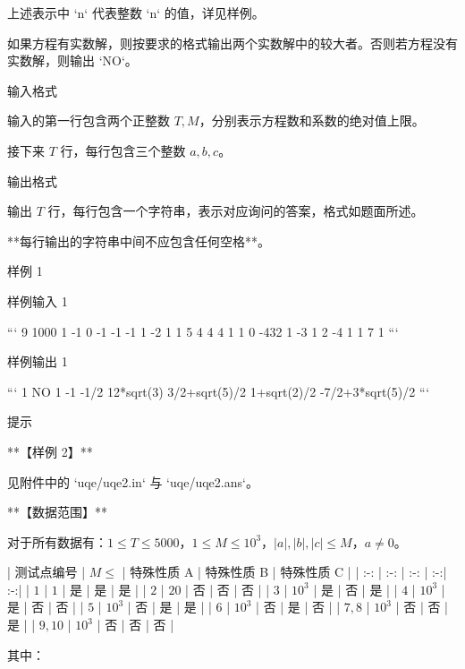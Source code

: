 \documentclass[12pt,twiside,a4paper]{ctexbook}
\numberwithin{chapter}{part}
\begin{document}
   上述表示中 `{n}` 代表整数 `{n}` 的值，详见样例。
   
   如果方程有实数解，则按要求的格式输出两个实数解中的较大者。否则若方程没有实数解，则输出 `NO`。

 输入格式

输入的第一行包含两个正整数 $T, M$，分别表示方程数和系数的绝对值上限。

接下来 $T$ 行，每行包含三个整数 $a, b, c$。

 输出格式

输出 $T$ 行，每行包含一个字符串，表示对应询问的答案，格式如题面所述。

**每行输出的字符串中间不应包含任何空格**。

 样例 1

 样例输入 1

```
9 1000
1 -1 0
-1 -1 -1
1 -2 1
1 5 4
4 4 1
1 0 -432
1 -3 1
2 -4 1
1 7 1
```

 样例输出 1

```
1
NO
1
-1
-1/2
12*sqrt(3)
3/2+sqrt(5)/2
1+sqrt(2)/2
-7/2+3*sqrt(5)/2
```

 提示

**【样例 2】**

见附件中的 `uqe/uqe2.in` 与 `uqe/uqe2.ans`。

**【数据范围】**

对于所有数据有：$1 \leq T \leq 5000$，$1 \leq M \leq 10 ^ 3$，$|a|,|b|,|c| \leq M$，$a \neq 0$。

| 测试点编号 | $M \leq$ | 特殊性质 A | 特殊性质 B | 特殊性质 C |
| :-: | :-: | :-: | :-:| :-:|
| $1$ | $1$ | 是 | 是 | 是 |
| $2$ | $20$ | 否 | 否 | 否 |
| $3$ | $10 ^ 3$ | 是 | 否 | 是 |
| $4$ | $10 ^ 3$  | 是 | 否 | 否 |
| $5$ | $10 ^ 3$  | 否 | 是 | 是 |
| $6$ | $10 ^ 3$  | 否 | 是 | 否 |
| $7, 8$ | $10 ^ 3$  | 否 | 否 | 是 |
| $9, 10$ | $10 ^ 3$  | 否 | 否 | 否 |

其中：
\end{document}
